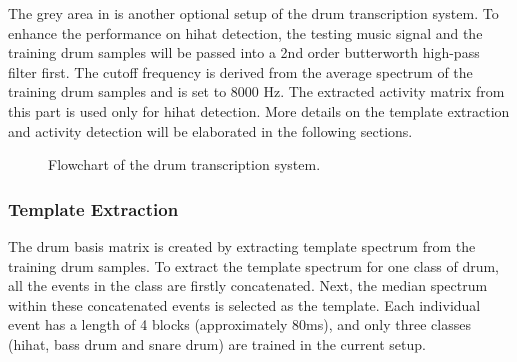 \documentclass{article}
\begin{document}
The grey area in  is another optional setup of the drum transcription system. To enhance the performance on hihat detection, the testing music signal and the training drum samples will be passed into a 2nd order butterworth high-pass filter first. The cutoff frequency is derived from the average spectrum of the training drum samples and is set to 8000 Hz. The extracted activity matrix from this part is used only for hihat detection. More details on the template extraction and activity detection will be elaborated in the following sections. 

\begin{figure}
 \centerline{}
 \caption{Flowchart of the drum transcription system.}
 \label{fig:flowchart}
\end{figure}

\subsubsection{Template Extraction}\label{subsubsec:template extraction}
The drum basis matrix is created by extracting template spectrum from the training drum samples. To extract the template spectrum for one class of drum, all the events in the class are firstly concatenated. Next, the median spectrum within these concatenated events is selected as the template. Each individual event has a length of 4 blocks (approximately 80ms), and only three classes (hihat, bass drum and snare drum) are trained in the current setup.   
\end{document}
